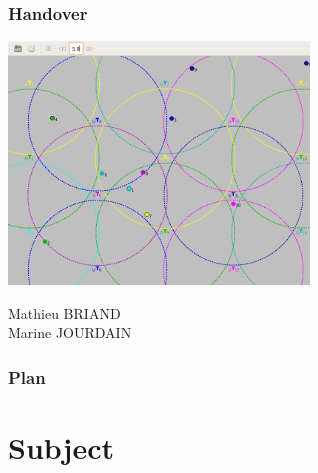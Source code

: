 \documentclass{beamer}
\begin{document}
\begin{frame}
\frametitle{Handover}
\begin{center}
  \includegraphics[width=0.6\textwidth]{./images/capture.png}
\end{center}

Mathieu BRIAND \\
Marine JOURDAIN

\end{frame}


\begin{frame}
\frametitle{Plan}
\tableofcontents

\end{frame}

\section{Subject}
\end{document}
